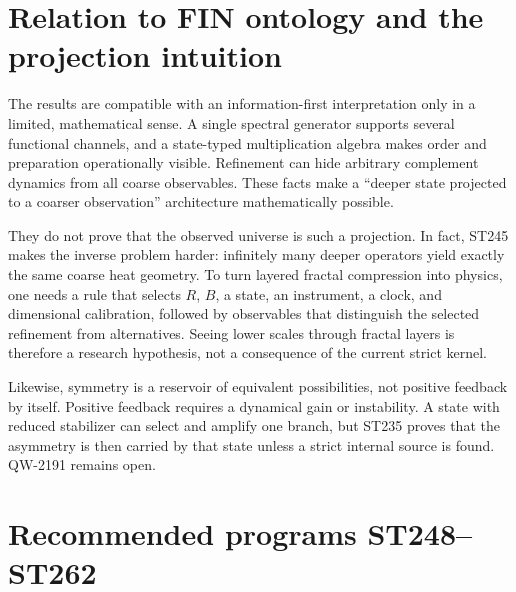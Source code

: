 \documentclass[11pt,a4paper]{article}
\begin{document}
\section{Relation to FIN ontology and the projection intuition}

The results are compatible with an information-first interpretation only in a limited,
mathematical sense. A single spectral generator supports several functional channels, and
a state-typed multiplication algebra makes order and preparation operationally visible.
Refinement can hide arbitrary complement dynamics from all coarse observables. These facts
make a ``deeper state projected to a coarser observation'' architecture mathematically
possible.

They do not prove that the observed universe is such a projection. In fact, ST245 makes the
inverse problem harder: infinitely many deeper operators yield exactly the same coarse
heat geometry. To turn layered fractal compression into physics, one needs a rule that
selects $R$, $B$, a state, an instrument, a clock, and dimensional calibration, followed by
observables that distinguish the selected refinement from alternatives. Seeing lower
scales through fractal layers is therefore a research hypothesis, not a consequence of the
current strict kernel.

Likewise, symmetry is a reservoir of equivalent possibilities, not positive feedback by
itself. Positive feedback requires a dynamical gain or instability. A state with reduced
stabilizer can select and amplify one branch, but ST235 proves that the asymmetry is then
carried by that state unless a strict internal source is found. QW-2191 remains open.

\section{Recommended programs ST248--ST262}
\end{document}
